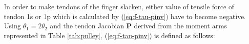 \documentclass{llncs}
\begin{document}
In order to make tendons of the finger slacken, either value of tensile force of tendon 1s or 1p which is calculated by (\ref{eq:f-tau-pinv}) have to become negative.
Using $\theta_1=2\theta_2$ and the tendon Jacobian $\bm{P}$ derived from the moment arms represented in Table \ref{tab:pulley}, 
(\ref{eq:f-tau-pinv}) is defined as follows:
\end{document}
